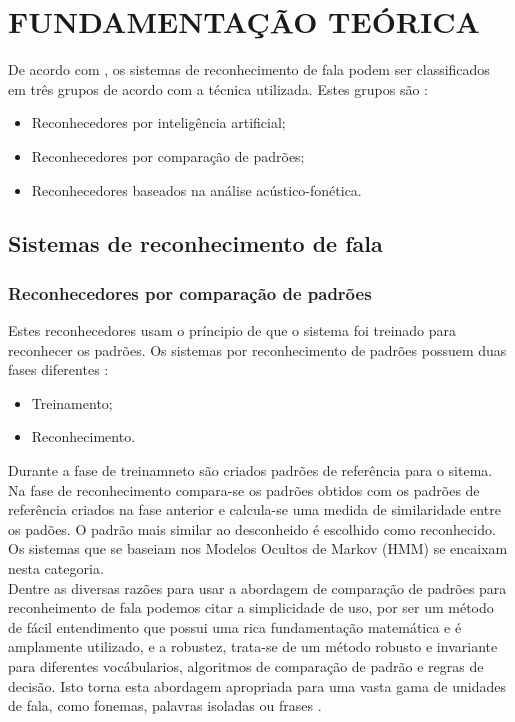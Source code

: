 \chapter{FUNDAMENTAÇÃO TEÓRICA}
\label{chap:referencial_teorico}
\thispagestyle{plain}
De acordo com \cite{fundRecFala}, os  sistemas de reconhecimento de fala podem ser classificados em três grupos de acordo com a técnica utilizada. Estes grupos são :
\begin{itemize}
\item Reconhecedores por inteligência artificial;
\item Reconhecedores por comparação de padrões;
\item Reconhecedores baseados na análise acústico-fonética.
\end{itemize}
\section{Sistemas de reconhecimento de fala }

\label{sec:sistemasdereconhecimentodefala}

\subsection{Reconhecedores por comparação de padrões}

Estes reconhecedores usam o príncipio de que o sistema foi treinado para reconhecer os padrões. Os sistemas por reconhecimento de padrões possuem duas fases diferentes :
\begin{itemize}
\item Treinamento;
\item Reconhecimento.
\end{itemize}

Durante a fase de treinamneto são criados padrões de referência para o sitema. Na fase de reconhecimento compara-se os padrões obtidos com os padrões de referência criados na fase anterior e calcula-se uma medida de similaridade entre os padões. O padrão mais similar ao desconheido é escolhido como reconhecido. Os sistemas que se baseiam nos Modelos Ocultos de Markov (HMM) se encaixam nesta categoria.\\

Dentre as diversas razões para usar a abordagem de comparação de padrões para reconheimento de fala podemos citar a simplicidade de uso, por ser um método de fácil entendimento que possui uma rica fundamentação matemática e é amplamente utilizado,  e a robustez, trata-se de um método robusto e invariante para diferentes vocábularios, algoritmos de comparação de padrão e regras de decisão. Isto torna esta abordagem apropriada para uma vasta gama de unidades de fala, como fonemas, palavras isoladas ou frases  \cite{fundRecFala}. 

